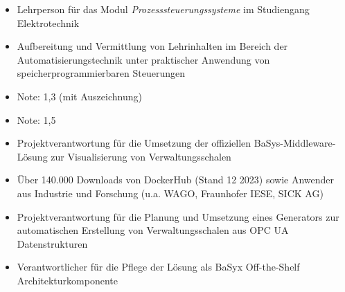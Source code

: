 \documentclass[10pt,a4paper,ragged2e,withhyper]{altacv}
\begin{document}
\begin{paracol}{2}
            \begin{itemize}
                \item Lehrperson für das Modul \textit{Prozesssteuerungssysteme} im Studiengang Elektrotechnik
                \item Aufbereitung und Vermittlung von Lehrinhalten im Bereich der Automatisierungstechnik unter praktischer Anwendung von speicherprogrammierbaren Steuerungen
            \end{itemize}
        
            \begin{itemize}
                \item Note: 1,3 (mit Auszeichnung)
            \end{itemize}
            \divider
            
            \begin{itemize}
                \item Note: 1,5
            \end{itemize}
        
            \begin{itemize}
                \item Projektverantwortung für die Umsetzung der offiziellen BaSys-Middleware-Lösung zur Visualisierung von Verwaltungsschalen
                \item Über 140.000 Downloads von DockerHub (Stand 12 2023) sowie Anwender aus Industrie und Forschung (u.a. WAGO, Fraunhofer IESE, SICK AG)
            \end{itemize}
            \divider
            
            \begin{itemize}
                \item Projektverantwortung für die Planung und Umsetzung eines Generators zur\\ automatischen Erstellung von Verwaltungsschalen aus OPC UA Datenstrukturen
                \item Verantwortlicher für die Pflege der Lösung als BaSyx Off-the-Shelf\\ Architekturkomponente
            \end{itemize}


\end{paracol}
\end{document}
